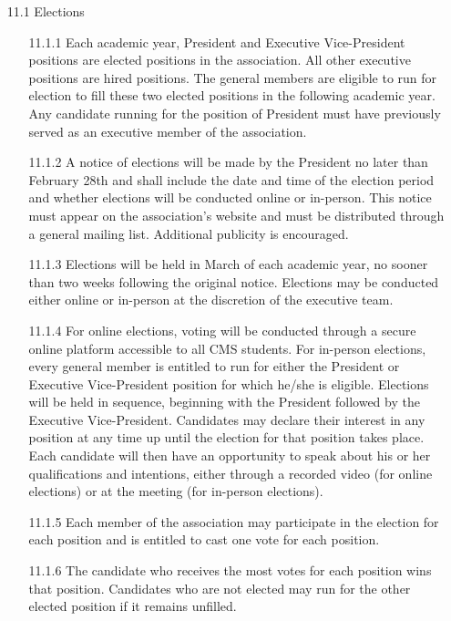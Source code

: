\documentclass[12pt,a4paper]{article}
\begin{document}
\begin{enumerate}
\item[11.1] Elections

\begin{enumerate}
\item[11.1.1] Each academic year, President and Executive Vice-President positions are elected positions in the association. All other executive positions are hired positions. The general members are eligible to run for election to fill these two elected positions in the following academic year. Any candidate running for the position of President must have previously served as an executive member of the association.

\item[11.1.2] A notice of elections will be made by the President no later than February 28th and shall include the date and time of the election period and whether elections will be conducted online or in-person. This notice must appear on the association's website and must be distributed through a general mailing list. Additional publicity is encouraged.

\item[11.1.3] Elections will be held in March of each academic year, no sooner than two weeks following the original notice. Elections may be conducted either online or in-person at the discretion of the executive team.

\item[11.1.4] For online elections, voting will be conducted through a secure online platform accessible to all CMS students. For in-person elections, every general member is entitled to run for either the President or Executive Vice-President position for which he/she is eligible. Elections will be held in sequence, beginning with the President followed by the Executive Vice-President. Candidates may declare their interest in any position at any time up until the election for that position takes place.
Each candidate will then have an opportunity to speak about his or her qualifications and intentions, either through a recorded video (for online elections) or at the meeting (for in-person elections).

\item[11.1.5] Each member of the association may participate in the election for each position and is entitled to cast one vote for each position.

\item[11.1.6] The candidate who receives the most votes for each position wins that position. Candidates who are not elected may run for the other elected position if it remains unfilled.


\end{enumerate}
\end{enumerate}
\end{document}
